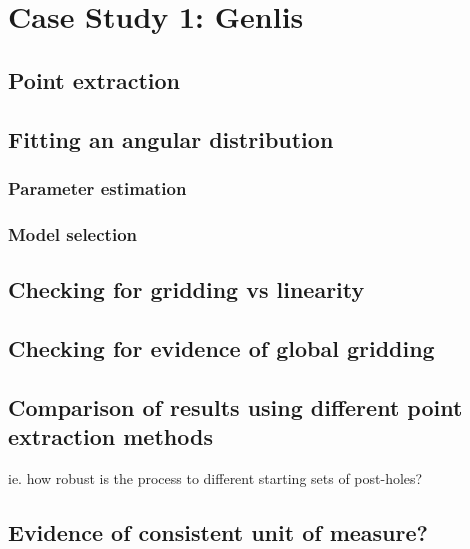 \documentclass[../../ArchStats.tex]{subfiles}
\begin{document}
\section{Case Study 1: Genlis}

\subsection{Point extraction}

\subsection{Fitting an angular distribution}

\subsubsection{Parameter estimation}
\subsubsection{Model selection}

\subsection{Checking for gridding vs linearity}

\subsection{Checking for evidence of global gridding}

\subsection{Comparison of results using different point extraction methods}
ie. how robust is the process to different starting sets of post-holes?

\subsection{Evidence of consistent unit of measure?}
\end{document}
